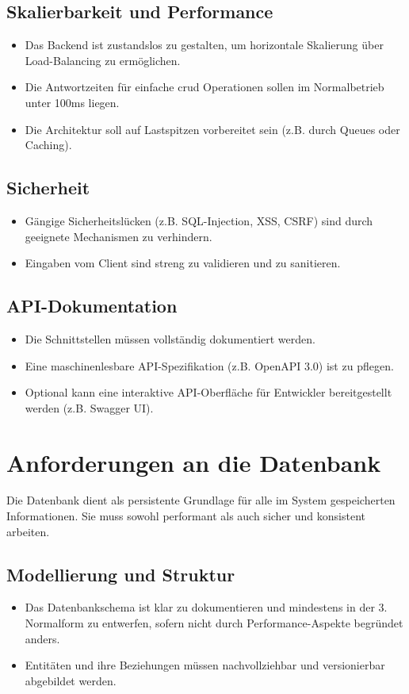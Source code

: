 \subsection{Skalierbarkeit und Performance}
\begin{itemize}
    \item Das Backend ist zustandslos zu gestalten, um horizontale Skalierung über Load-Balancing zu ermöglichen.
    \item Die Antwortzeiten für einfache \ac{crud} Operationen sollen im Normalbetrieb unter 100ms liegen.
    \item Die Architektur soll auf Lastspitzen vorbereitet sein (z.B. durch Queues oder Caching).
\end{itemize}

\subsection{Sicherheit}
\begin{itemize}
    \item Gängige Sicherheitslücken (z.B. SQL-Injection, XSS, CSRF) sind durch geeignete Mechanismen zu verhindern.
    \item Eingaben vom Client sind streng zu validieren und zu sanitieren.
\end{itemize}

\subsection{API-Dokumentation}
\begin{itemize}
    \item Die Schnittstellen müssen vollständig dokumentiert werden.
    \item Eine maschinenlesbare API-Spezifikation (z.B. OpenAPI 3.0) ist zu pflegen.
    \item Optional kann eine interaktive API-Oberfläche für Entwickler bereitgestellt werden (z.B. Swagger UI).
\end{itemize}

\section{Anforderungen an die Datenbank}
Die Datenbank dient als persistente Grundlage für alle im System gespeicherten Informationen. Sie muss sowohl performant als auch sicher und konsistent arbeiten.

\subsection{Modellierung und Struktur}
\begin{itemize}
    \item Das Datenbankschema ist klar zu dokumentieren und mindestens in der 3. Normalform zu entwerfen, sofern nicht durch Performance-Aspekte begründet anders.
    \item Entitäten und ihre Beziehungen müssen nachvollziehbar und versionierbar abgebildet werden.
\end{itemize}

